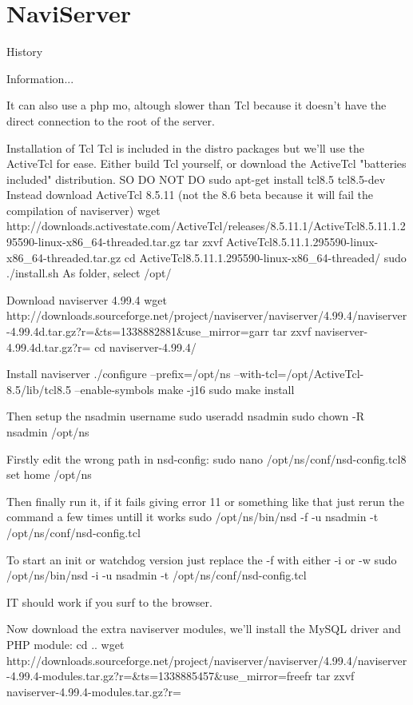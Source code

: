 \section{NaviServer}
History

Information...

It can also use a php mo, altough slower than Tcl because it doesn't have the direct connection to the root of the server.

Installation of Tcl
Tcl is included in the distro packages but we'll use the ActiveTcl for ease.
Either build Tcl yourself, or download the ActiveTcl "batteries included" distribution.
SO DO NOT DO
sudo apt-get install tcl8.5 tcl8.5-dev
Instead download ActiveTcl 8.5.11 (not the 8.6 beta because it will fail the compilation of naviserver)
wget http://downloads.activestate.com/ActiveTcl/releases/8.5.11.1/ActiveTcl8.5.11.1.295590-linux-x86_64-threaded.tar.gz
tar zxvf ActiveTcl8.5.11.1.295590-linux-x86_64-threaded.tar.gz
cd ActiveTcl8.5.11.1.295590-linux-x86_64-threaded/
sudo ./install.sh
As folder, select /opt/

Download naviserver 4.99.4
wget http://downloads.sourceforge.net/project/naviserver/naviserver/4.99.4/naviserver-4.99.4d.tar.gz?r=&ts=1338882881&use_mirror=garr
tar zxvf naviserver-4.99.4d.tar.gz?r=
cd naviserver-4.99.4/

Install naviserver
./configure --prefix=/opt/ns --with-tcl=/opt/ActiveTcl-8.5/lib/tcl8.5 --enable-symbols
make -j16
sudo make install

Then setup the nsadmin username
sudo useradd nsadmin
sudo chown -R nsadmin /opt/ns

Firstly edit the wrong path in nsd-config:
sudo nano /opt/ns/conf/nsd-config.tcl8
set home /opt/ns

Then finally run it, if it fails giving error 11 or something like that just rerun the command a few times untill it works
sudo /opt/ns/bin/nsd -f -u nsadmin -t /opt/ns/conf/nsd-config.tcl

To start an init or watchdog version just replace the -f with either -i or -w 
sudo /opt/ns/bin/nsd -i -u nsadmin -t /opt/ns/conf/nsd-config.tcl

IT should work if you surf to the browser.

Now download the extra naviserver modules, we'll install the MySQL driver and PHP module:
cd ..
wget http://downloads.sourceforge.net/project/naviserver/naviserver/4.99.4/naviserver-4.99.4-modules.tar.gz?r=&ts=1338885457&use_mirror=freefr
tar zxvf naviserver-4.99.4-modules.tar.gz?r= 

